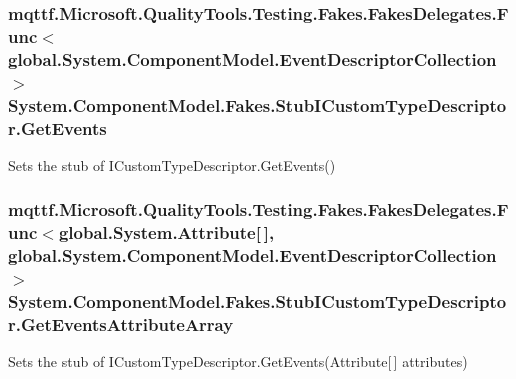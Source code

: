 \hypertarget{class_system_1_1_component_model_1_1_fakes_1_1_stub_i_custom_type_descriptor_afe91ec80ecaac93af234c2a120d56033}{
\subsubsection[{Get\-Events}]{\setlength{\rightskip}{0pt plus 5cm}mqttf.\-Microsoft.\-Quality\-Tools.\-Testing.\-Fakes.\-Fakes\-Delegates.\-Func$<$global.\-System.\-Component\-Model.\-Event\-Descriptor\-Collection$>$ System.\-Component\-Model.\-Fakes.\-Stub\-I\-Custom\-Type\-Descriptor.\-Get\-Events}}\label{class_system_1_1_component_model_1_1_fakes_1_1_stub_i_custom_type_descriptor_afe91ec80ecaac93af234c2a120d56033}


Sets the stub of I\-Custom\-Type\-Descriptor.\-Get\-Events()

\hypertarget{class_system_1_1_component_model_1_1_fakes_1_1_stub_i_custom_type_descriptor_a4ffb5661e9de3c532bec965d502d5bbf}{
\subsubsection[{Get\-Events\-Attribute\-Array}]{\setlength{\rightskip}{0pt plus 5cm}mqttf.\-Microsoft.\-Quality\-Tools.\-Testing.\-Fakes.\-Fakes\-Delegates.\-Func$<$global.\-System.\-Attribute\mbox{[}$\,$\mbox{]}, global.\-System.\-Component\-Model.\-Event\-Descriptor\-Collection$>$ System.\-Component\-Model.\-Fakes.\-Stub\-I\-Custom\-Type\-Descriptor.\-Get\-Events\-Attribute\-Array}}\label{class_system_1_1_component_model_1_1_fakes_1_1_stub_i_custom_type_descriptor_a4ffb5661e9de3c532bec965d502d5bbf}


Sets the stub of I\-Custom\-Type\-Descriptor.\-Get\-Events(\-Attribute\mbox{[}$\,$\mbox{]} attributes)


